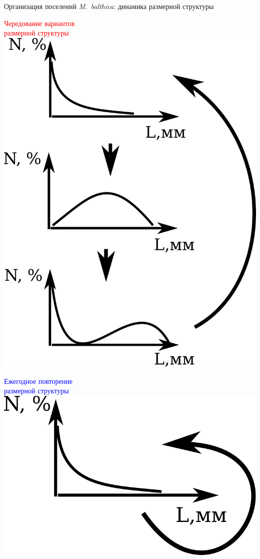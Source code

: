 \documentclass{beamer}
\begin{document}
\begin{frame}{Организация поселений {\it M.~balthica}: динамика размерной структуры}
\begin{minipage}[t]{.53\linewidth}
	\end{minipage}
%
	\begin{minipage}[t]{.45\linewidth}
		\begin{center}
	\textcolor{red}{\footnotesize Чередование вариантов\\ размерной структуры}
			\includegraphics[width=.65\textwidth]{Dymanic_cheredovanie.pdf}

	\textcolor{blue}{\footnotesize Ежегодное повторение\\ размерной структуры}\\
			\includegraphics[width=.65\textwidth]{Dymanic_povtorenie.pdf}\\


		\end{center}
	\end{minipage}
\end{frame}

\end{document}
